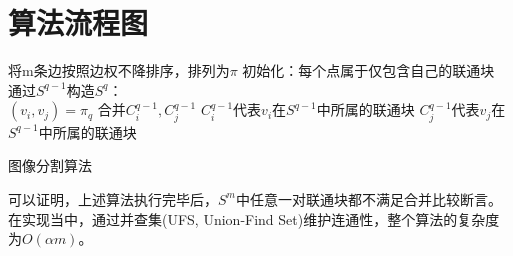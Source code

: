 \section{算法流程图}
\label{sec:seg}
\begin{algorithm}[h]
将m条边按照边权不降排序，排列为$\pi$\;
初始化：每个点属于仅包含自己的联通块\;
{
    通过$S^{q-1}$构造$S^q$： \\
    $(v_i,v_j)=\pi_q$\;
    {
        合并$C^{q-1}_i,C^{q-1}_j$\;
        $C^{q-1}_i$代表$v_i$在$S^{q-1}$中所属的联通块\;
        $C^{q-1}_j$代表$v_j$在$S^{q-1}$中所属的联通块\;
    }
}
\caption{图像分割算法}
\end{algorithm}
可以证明，上述算法执行完毕后，$S^{m}$中任意一对联通块都不满足合并比较断言。在实现当中，通过并查集(UFS, Union-Find Set)维护连通性，整个算法的复杂度为$O(\alpha m)$。

